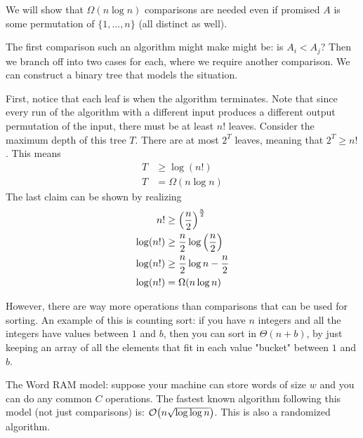 \begin{theorem} 
    We will show that $\Omega(n \log n)$ comparisons are needed even if promised
    $A$ is some permutation of $\{1, \dots, n\}$ (all distinct as well).

    \begin{proof*}
        The first comparison such an algorithm might make might be:
        is $A_i < A_j$? Then we branch off into two cases for each, where we require another comparison.
        We can construct a binary tree that models the situation.



        First, notice that each leaf is when the algorithm terminates. Note that since every run of the algorithm with a different
        input produces a different output permutation of the input, there must be at least $n!$ leaves.
        Consider the maximum depth of this tree $T$. There are at most $2^T$ leaves, meaning that $2^T \geq n!$. This means
        \begin{align*}
            T &\geq \log(n!) \\
            T &= \Omega(n \log n)
        \end{align*}
        The last claim can be shown by realizing
        \begin{align*}
            n! &\geq \qty(\frac{n}{2})^\frac{n}{2} \\
            \log(n!) &\geq \frac{n}{2} \log\qty(\frac{n}{2})\\
            \log(n!) &\geq \frac{n}{2} \log n - \frac{n}{2} \\
            \log(n!) &= \Omega(n \log n)
        \end{align*}
    \end{proof*}
\end{theorem}

However, there are way more operations than comparisons that can be used for sorting. An example of this is counting sort:
if you have $n$ integers and all the integers have values between $1$ and $b$, then you can sort in $\Theta(n + b)$, by just
keeping an array of all the elements that fit in each value "bucket" between $1$ and $b$. 

The Word RAM model: suppose your machine can store words of size $w$ and you can do any common $C$ operations. The fastest known algorithm
following this model (not just comparisons) is: $\mathcal{O}\qty(n \sqrt{\log \log n})$. This is also a randomized algorithm.


